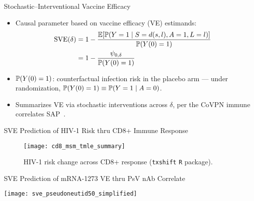 \documentclass{beamer}
\begin{document}
\begin{frame}[c]{Stochastic--Interventional Vaccine Efficacy}

\begin{center}
\begin{itemize}
  \itemsep8pt
  \item Causal parameter based on vaccine efficacy (VE) estimands:
  \begin{align*}
    \text{SVE}(\delta) &= 1 - \frac{\mathbb{E}[\mathbb{P}(Y = 1 \mid S = d(s, l), A = 1,
                                    L = l)]}{\mathbb{P}(Y(0)=1)} \\
                       &= 1 - \frac{\psi_{0, \delta}}{\mathbb{P}(Y(0)=1)}
  \end{align*}
  \item $\mathbb{P}(Y(0)=1)$: counterfactual infection risk in the placebo arm ---
    under randomization, $\mathbb{P}(Y(0)=1) \equiv \mathbb{P}(Y=1 \mid A=0)$.
  \item Summarizes VE via stochastic interventions across $\delta$, per the
    CoVPN immune correlates SAP\footnotemark~\citep{gilbert2021covpn,
    gilbert2021immune}.
\end{itemize}
\end{center}

\note{
}


\end{frame}


\begin{frame}[c]{SVE Prediction of HIV-1 Risk thru CD8+ Immune Response}

\vspace{-0.3in}
\begin{figure}[H]
  \centering
  \texttt{[image: cd8\_msm\_tmle\_summary]}
  \captionsetup{labelformat=empty}
  \vspace{-1.5em}
  \caption{
    HIV-1 risk change across CD8+ response (\texttt{txshift} \texttt{R}
    package).
  }
\end{figure}

\note{
}

\end{frame}


\begin{frame}[c]{SVE Prediction of mRNA-1273 VE thru PsV nAb Correlate}

\vspace*{-0.1cm}
\hspace*{-0.3cm}\texttt{[image: sve\_pseudoneutid50\_simplified]}

\note{
}

\end{frame}
\end{document}
